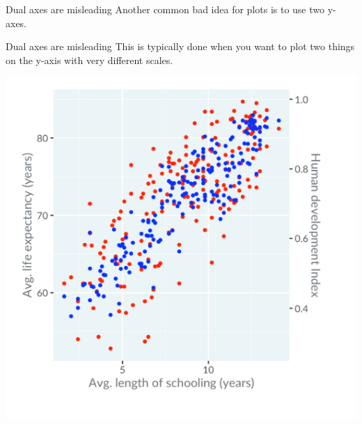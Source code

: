 \documentclass[
  ignorenonframetext,
]{beamer}
\begin{document}
\begin{frame}{Dual axes are misleading}
\label{dual-axes-are-misleading}
Another common bad idea for plots is to use two y-axes.
\end{frame}

\begin{frame}{Dual axes are misleading}
\label{dual-axes-are-misleading-1}
This is typically done when you want to plot two things on the y-axis
with very different scales.

\includegraphics{../images/im109.png}
\end{frame}
\end{document}
